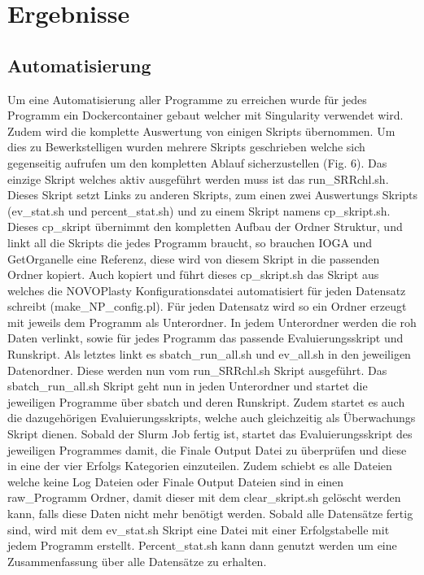 \documentclass{scrartcl}
\begin{document}
\section{Ergebnisse}
\label{sec-4}
\subsection{Automatisierung}
\label{sec-4-1}
Um eine Automatisierung aller Programme zu erreichen wurde für jedes Programm ein Dockercontainer gebaut welcher mit Singularity verwendet wird. Zudem wird die komplette Auswertung von einigen Skripts 
übernommen. Um dies zu Bewerkstelligen wurden mehrere Skripts geschrieben welche sich gegenseitig aufrufen um den kompletten Ablauf sicherzustellen (Fig. 6). 
Das einzige Skript welches aktiv ausgeführt werden muss ist das run\_SRRchl.sh. Dieses Skript setzt Links zu anderen Skripts, zum einen zwei Auswertungs Skripts (ev\_stat.sh und percent\_stat.sh) und
zu einem Skript namens cp\_skript.sh. Dieses cp\_skript übernimmt den kompletten Aufbau der Ordner Struktur, und linkt all die Skripts die jedes Programm braucht, so brauchen IOGA und GetOrganelle
eine Referenz, diese wird von diesem Skript in die passenden Ordner kopiert. Auch kopiert und führt dieses cp\_skript.sh das Skript aus welches die NOVOPlasty Konfigurationsdatei automatisiert für jeden
Datensatz schreibt (make\_NP\_config.pl). Für jeden Datensatz wird so ein Ordner erzeugt mit jeweils dem Programm als Unterordner. In jedem Unterordner werden die roh Daten verlinkt, sowie für jedes Programm
das passende Evaluierungsskript und Runskript. Als letztes linkt es sbatch\_run\_all.sh und ev\_all.sh in den jeweiligen Datenordner. Diese werden nun vom run\_SRRchl.sh Skript ausgeführt. Das sbatch\_run\_all.sh
Skript geht nun in jeden Unterordner und startet die jeweiligen Programme über sbatch und deren Runskript. Zudem startet es auch die dazugehörigen Evaluierungsskripts, welche auch gleichzeitig als Überwachungs
Skript dienen. Sobald der Slurm Job fertig ist, startet das Evaluierungsskript des jeweiligen Programmes damit, die Finale Output Datei zu überprüfen und diese in eine der vier Erfolgs Kategorien einzuteilen. Zudem
schiebt es alle Dateien welche keine Log Dateien oder Finale Output Dateien sind in einen raw\_Programm Ordner, damit dieser mit dem clear\_skript.sh gelöscht werden kann, falls diese Daten nicht mehr benötigt werden.
Sobald alle Datensätze fertig sind, wird mit dem ev\_stat.sh Skript eine Datei mit einer Erfolgstabelle mit jedem Programm erstellt. Percent\_stat.sh kann dann genutzt werden um eine Zusammenfassung über alle Datensätze 
zu erhalten.
\end{document}
